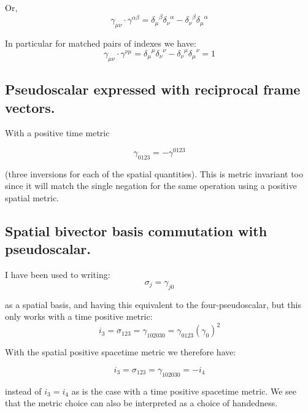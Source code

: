 Or,
\begin{equation}
\gamma_{\mu\nu} \cdot \gamma^{\alpha\beta} = {\delta_{\mu}}^{\beta} {\delta_{\nu}}^{\alpha} - {\delta_{\nu}}^{\beta} {\delta_{\mu}}^{\alpha}
\end{equation}

In particular for matched pairs of indexes we have:
\begin{equation*}
\gamma_{\mu\nu} \cdot \gamma^{\nu\mu} = {\delta_{\mu}}^{\mu} {\delta_{\nu}}^{\nu} - {\delta_{\nu}}^{\mu} {\delta_{\mu}}^{\nu} = 1
\end{equation*}

\subsection{Pseudoscalar expressed with reciprocal frame vectors. }

With a positive time metric

\begin{equation*}
\gamma_{0123} = -\gamma^{0123}
\end{equation*}

(three inversions for each of the spatial quantities).  This is metric invariant too since it will match the single negation for the same operation
using a positive spatial metric.

\subsection{Spatial bivector basis commutation with pseudoscalar. }

I have been used to writing:
\begin{equation*}
\sigma_j = \gamma_{j0}
\end{equation*}

as a spatial basis, and having this equivalent to the four-pseudoscalar, but this only works with a time positive metric:
\begin{equation*}
i_3 = \sigma_{123} = \gamma_{102030} = \gamma_{0123} (\gamma_0)^2
\end{equation*}

With the spatial positive spacetime metric we therefore have:

\begin{equation*}
i_3 = \sigma_{123} = \gamma_{102030} = -i_4
\end{equation*}

instead of $i_3 = i_4$ as is the case with a time positive spacetime metric.  We see that the metric choice can also be interpreted as a choice of handedness.

